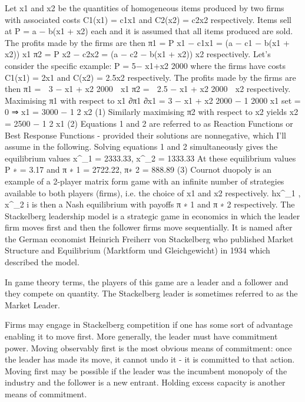 Let x1 and x2 be the quantities of homogeneous items produced by two firms with associated
costs C1(x1) = c1x1 and C2(x2) = c2x2 respectively.
Items sell at P = a − b(x1 + x2) each and it is assumed that all items produced are sold.
The profits made by the firms are then
π1 = P x1 − c1x1 = (a − c1 − b(x1 + x2)) x1
π2 = P x2 − c2x2 = (a − c2 − b(x1 + x2)) x2
respectively.
Let’s consider the specific example: P = 5−
x1+x2
2000 where the firms have costs C1(x1) = 2x1
and C(x2) = 2.5x2 respectively.
The profits made by the firms are then
π1 =

3 −
x1 + x2
2000 
x1
π2 =

2.5 −
x1 + x2
2000 
x2
respectively.
Maximising π1 with respect to x1
∂π1
∂x1
= 3 −
x1 + x2
2000
−
1
2000
x1
set = 0
⇒ x1 = 3000 −
1
2
x2 (1)
Similarly maximising π2 with respect to x2 yields
x2 = 2500 −
1
2
x1 (2)
Equations 1 and 2 are referred to as Reaction Functions or Best Response Functions -
provided their solutions are nonnegative, which I’ll assume in the following.
Solving equations 1 and 2 simultaneously gives the equilibrium values 
x^{\ast}_1  = 2333.33, x^{\ast}_2 = 1333.33
At these equilibrium values
P
∗ = 3.17
and
π
∗
1 = 2722.22, π∗
2 = 888.89 (3)
Cournot duopoly is an example of a 2-player matrix form game with an infinite number
of strategies available to both players (firms), i.e. the choice of x1 and x2 respectively.
hx^{\ast}_1 
, x^{\ast}_2
i is then a Nash equilibrium with payoffs π
∗
1
and π
∗
2
respectively.
\newpage
The Stackelberg leadership model is a strategic game in economics in which the leader firm moves first and then the follower firms move sequentially. It is named after the German economist Heinrich Freiherr von Stackelberg who published Market Structure and Equilibrium (Marktform und Gleichgewicht) in 1934 which described the model.

In game theory terms, the players of this game are a leader and a follower and they compete on quantity. The Stackelberg leader is sometimes referred to as the Market Leader.

Firms may engage in Stackelberg competition if one has some sort of advantage enabling it to move first. More generally, the leader must have commitment power. Moving observably first is the most obvious means of commitment: once the leader has made its move, it cannot undo it - it is committed to that action. Moving first may be possible if the leader was the incumbent monopoly of the industry and the follower is a new entrant. Holding excess capacity is another means of commitment.


